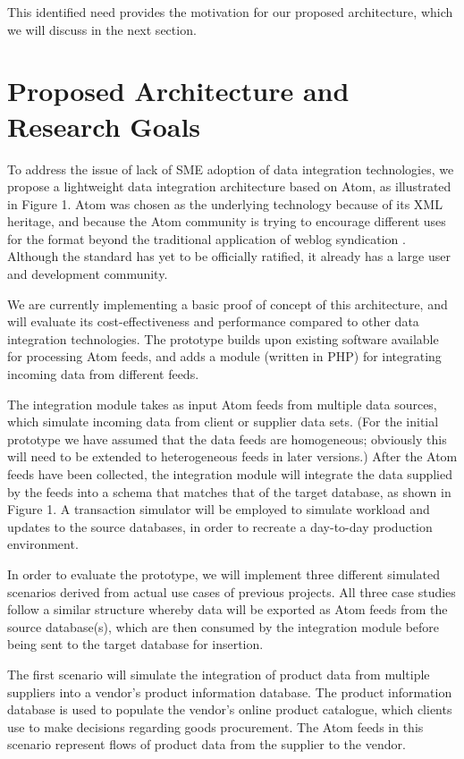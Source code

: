 \documentclass{CRPITStyle}
\begin{document}
This identified need provides the motivation for our proposed
architecture, which we will discuss in the next section.

\section{Proposed Architecture and Research Goals}

To address the issue of lack of SME adoption of data integration
technologies, we propose a lightweight data integration architecture
based on Atom, as illustrated in Figure 1. Atom was chosen as the
underlying technology because of its XML heritage, and because the Atom
community is trying to encourage different uses for the format beyond
the traditional application of weblog syndication
\cite{Nott-M-2005-Atom}. Although the standard has yet to be officially
ratified, it already has a large user and development community.

We are currently implementing a basic proof of concept of this
architecture, and will evaluate its cost-effectiveness and performance
compared to other data integration technologies. The prototype builds
upon existing software available for processing Atom feeds, and adds a
module (written in PHP) for integrating incoming data from different
feeds.

The integration module takes as input Atom feeds from multiple data
sources, which simulate incoming data from client or supplier data sets.
(For the initial prototype we have assumed that the data feeds are
homogeneous; obviously this will need to be extended to heterogeneous
feeds in later versions.) After the Atom feeds have been collected, the
integration module will integrate the data supplied by the feeds into a
schema that matches that of the target database, as shown in Figure 1. A
transaction simulator will be employed to simulate workload and updates
to the source databases, in order to recreate a day-to-day production
environment.

In order to evaluate the prototype, we will implement three different
simulated scenarios derived from actual use cases of previous projects.
All three case studies follow a similar structure whereby data will be
exported as Atom feeds from the source database(s), which are then
consumed by the integration module before being sent to the target
database for insertion.

The first scenario will simulate the integration of product data from
multiple suppliers into a vendor's product information database. The
product information database is used to populate the vendor's online
product catalogue, which clients use to make decisions regarding goods
procurement. The Atom feeds in this scenario represent flows of product
data from the supplier to the vendor.
\end{document}
